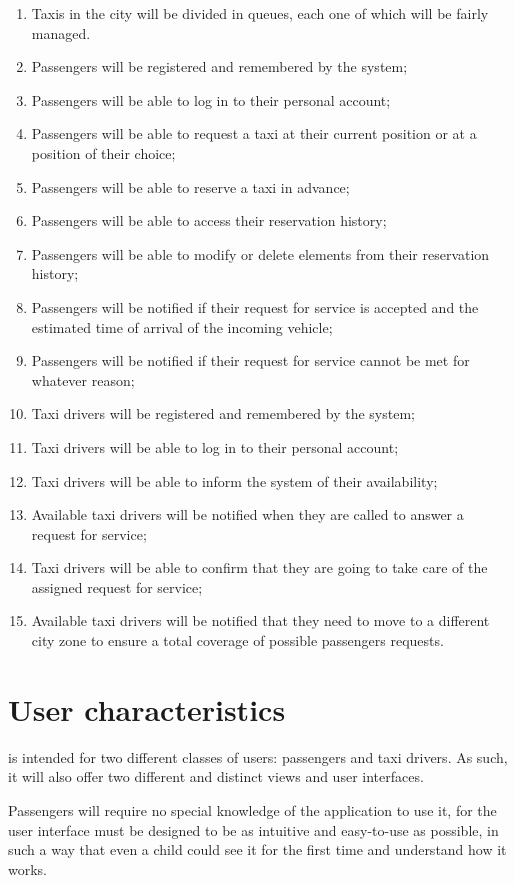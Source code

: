\begin{enumerate}
\item Taxis in the city will be divided in queues, each one of which will be fairly managed.
\item Passengers will be registered and remembered by the system;
\item Passengers will be able to log in to their personal account;
\item Passengers will be able to request a taxi at their current position or at a position of their choice;
\item Passengers will be able to reserve a taxi in advance;
\item Passengers will be able to access their reservation history;
\item Passengers will be able to modify or delete elements from their reservation history;
\item Passengers will be notified if their request for service is accepted and the estimated time of arrival of the incoming vehicle;
\item Passengers will be notified if their request for service cannot be met for whatever reason;
\item Taxi drivers will be registered and remembered by the system;
\item Taxi drivers will be able to log in to their personal account;
\item Taxi drivers will be able to inform the system of their availability;
\item Available taxi drivers will be notified when they are called to answer a request for service;
\item Taxi drivers will be able to confirm that they are going to take care of the assigned request for service;
\item Available taxi drivers will be notified that they need to move to a different city zone to ensure a total coverage of possible passengers requests.
\end{enumerate}

\section{User characteristics}
\mts{} is intended for two different classes of users: passengers and taxi drivers. As such, it will also offer two different and distinct views and user interfaces.

Passengers will require no special knowledge of the application to use it, for the user interface must be designed to be as intuitive and easy-to-use as possible, in such a way that even a child could see it for the first time and understand how it works.

